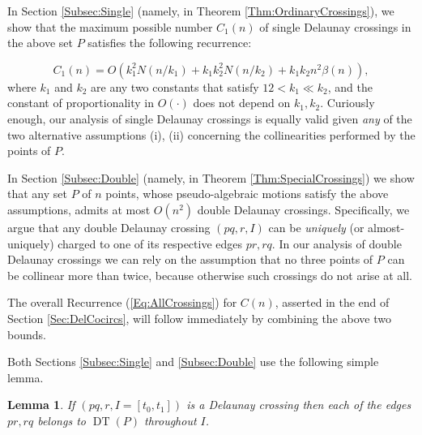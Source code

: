 \documentclass[letter,11pt]{article}
\newtheorem{lemma}[theorem]{Lemma}
\def\DT{\mathop{\mathrm{DT}}}
\begin{document}
In Section \ref{Subsec:Single} (namely, in Theorem \ref{Thm:OrdinaryCrossings}), we show that the maximum possible number $C_1(n)$ of single Delaunay crossings in the above set $P$ satisfies the following recurrence:

\begin{equation}\label{Eq:Single}
C_1(n)=O\left(k_1^2 N(n/k_1)+k_1 k_2^2 N(n/k_2)+k_1k_2n^2\beta(n)\right), 
\end{equation}
where $k_1$ and $k_2$ are any two constants that satisfy $12<k_1\ll k_2$, and the constant of proportionality in $O(\cdot)$ does not depend on $k_1,k_2$. Curiously enough, our analysis of single Delaunay crossings is equally valid given {\it any} of the two alternative assumptions (i), (ii) concerning the collinearities performed by the points of $P$.

In Section \ref{Subsec:Double} (namely, in Theorem \ref{Thm:SpecialCrossings}) we show that any set $P$ of $n$ points, whose pseudo-algebraic motions satisfy the above assumptions, admits at most $O(n^2)$ double Delaunay crossings. Specifically, we argue that any double Delaunay crossing $(pq,r,I)$ can be {\it uniquely} (or almost-uniquely) charged to one of its respective edges $pr,rq$.
In our analysis of double Delaunay crossings we can rely on the assumption that no three points of $P$ can be collinear more than twice, because otherwise such crossings do not arise at all.

The overall Recurrence (\ref{Eq:AllCrossings}) for $C(n)$, asserted in the end of Section \ref{Sec:DelCocircs}, will follow immediately by combining the above two bounds.






\smallskip
Both Sections \ref{Subsec:Single} and \ref{Subsec:Double} use the following simple lemma.


\begin{lemma}\label{Lemma:Crossing}
If $(pq,r,I=[t_0,t_1])$ is a Delaunay crossing then each of the edges $pr,rq$ belongs to $\DT(P)$ throughout $I$.
\end{lemma}
\end{document}

